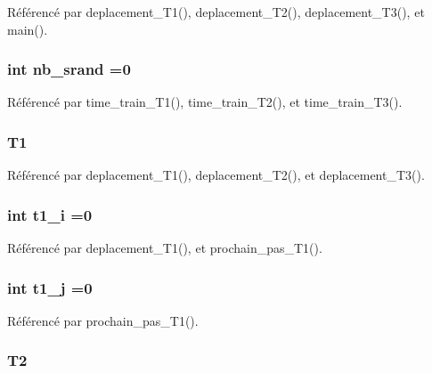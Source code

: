 Référencé par deplacement\+\_\+\+T1(), deplacement\+\_\+\+T2(), deplacement\+\_\+\+T3(), et main().

\subsubsection[{nb\+\_\+srand}]{\setlength{\rightskip}{0pt plus 5cm}int nb\+\_\+srand =0}\label{thread_8h_ad60aefec97df52accbacfdb97c21b66e}


Référencé par time\+\_\+train\+\_\+\+T1(), time\+\_\+train\+\_\+\+T2(), et time\+\_\+train\+\_\+\+T3().

\subsubsection[{T1}]{ T1}\label{thread_8h_af7563d32dc157f89b5e9b386e7734975}


Référencé par deplacement\+\_\+\+T1(), deplacement\+\_\+\+T2(), et deplacement\+\_\+\+T3().

\subsubsection[{t1\+\_\+i}]{\setlength{\rightskip}{0pt plus 5cm}int t1\+\_\+i =0}\label{thread_8h_af6ffa3874789c1110bfa3560595be366}


Référencé par deplacement\+\_\+\+T1(), et prochain\+\_\+pas\+\_\+\+T1().

\subsubsection[{t1\+\_\+j}]{\setlength{\rightskip}{0pt plus 5cm}int t1\+\_\+j =0}\label{thread_8h_ad42771e3cfc13cf554e80f172ee24850}


Référencé par prochain\+\_\+pas\+\_\+\+T1().

\subsubsection[{T2}]{ T2}\label{thread_8h_a2f9633591cf59fbea33044d61e3b12df}



